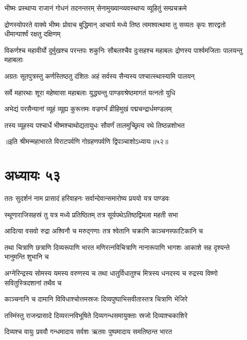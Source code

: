 \twolineshloka
{भीष्मः प्रस्थाप्य राजानं गोधनं तदनन्तरम्}
{सेनामुख्यान्व्यवस्थाप्य व्यूहितुं सम्प्रचक्रमे}


\threelineshloka
{द्रोणस्योपरते वाक्ये भीष्मः प्रोवाच बुद्धिमान्}
{आचार्य मध्ये तिष्ठ त्वमश्वत्थामा तु सव्यतः}
{कृपः शारद्वतो धीमान्पार्श्वं रक्षतु दक्षिणम्}


\threelineshloka
{विकर्णश्च महावीर्यो दुर्मुखश्च परन्तपः}
{शकुनिः सौबलश्चैव दुःसहश्च महाबलः}
{द्रोणस्य पार्श्वमजिताः पालयन्तु महाबलाः}


\twolineshloka
{अग्रतः सूतपुत्रस्तु कर्णस्तिष्ठतु दंशितः}
{अहं सर्वस्य सैन्यस्य पश्चात्स्थास्यामि पालयन्}


\twolineshloka
{सर्वे महारथाः शूरा महेष्वासा महाबलाः}
{युद्ध्यन्तु पाण्डवश्रेष्ठमागतं यत्नतो युधि}



\twolineshloka
{अभेद्यं परसैन्यानां व्यूहं व्यूह्य कुरूत्तमः}
{वज्रगर्भं व्रीहिमुखं पद्मचन्द्रार्धमण्डलम्}


\twolineshloka
{तस्य व्यूहस्य पश्चार्धे भीष्मश्चाथोद्यतायुधः}
{सौवर्णं तालमुच्छ्रित्य रथे तिष्ठन्नशोभत}

॥इति श्रीमन्महाभारते विराटपर्वणि गोग्रहणपर्वणि द्विपञ्चाशोऽध्यायः॥५२॥

\chapter{अध्यायः ५३}

\twolineshloka
{ततः सुदर्शनं नाम प्रासादं हरिवाहनः}
{सर्वान्देवान्समारोष्य प्रययो यत्र पाण्डवः}


\twolineshloka
{स्थूणाराजिसहस्रं तु यत्र मध्ये प्रतिष्ठितम्}
{तत्र सूर्यपथेऽतिष्ठद्विमला महती सभा}


\twolineshloka
{आदित्या वसवो रुद्रा अश्विनौ च मरुद्गणाः}
{तत्र श्वेतानि चक्राणि काञ्चनस्फाटिकानि च}


\threelineshloka
{तथा चित्राणि छत्राणि दिव्यरूपाणि भारत}
{मणिरत्नविचित्राणि नानारूपाणि भागशः}
{आकाशे सह दृश्यन्ते भानुमन्ति शुभानि च}


\threelineshloka
{अग्नेरिन्द्रस्य सोमस्य यमस्य वरुणस्य च}
{तथा धातुर्विधातुश्च मित्रस्य धनदस्य च}
{रुद्रस्य विष्णो सवितुस्त्रिदशानां तथैव च}


\twolineshloka
{काञ्चनानि च दामानि विविधाश्चोत्तमस्रजः}
{दिव्यपुष्पाभिसवीतास्तत्र चित्राणि भेजिरे}


\twolineshloka
{तस्मिंस्तु राजन्प्रासादे दिव्यरत्नविभूषिते}
{दिव्यगन्धसमायुक्ताः स्रजो दिव्याश्चकाशिरे}


\twolineshloka
{दिव्यश्च वायुः प्रववौ गन्धमादाय सर्वशः}
{ऋतवः पुष्पमादाय समतिष्ठन्त भारत}


